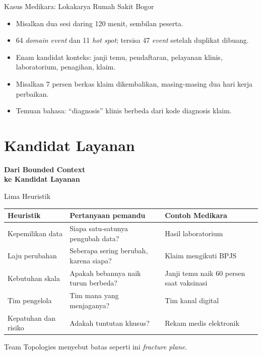 \documentclass[aspectratio=169, table, 12pt]{beamer}
\begin{document}
\begin{frame}{{\Large Kasus Medikara: Lokakarya Rumah Sakit Bogor}}
  \vspace{10pt}
  \begin{itemize}
    \item Misalkan dua sesi daring 120 menit, sembilan peserta.
    \item 64 \textit{domain event} dan 11 \textit{hot spot}; tersisa 47
          \textit{event} setelah duplikat dibuang.
    \item Enam kandidat konteks: janji temu, pendaftaran, pelayanan klinis,
          laboratorium, penagihan, klaim.
    \item Misalkan 7 persen berkas klaim dikembalikan, masing-masing dua hari kerja
          perbaikan.
    \item Temuan bahasa: ``diagnosis'' klinis berbeda dari kode diagnosis klaim.
  \end{itemize}
\end{frame}

\section{Kandidat Layanan}

\begin{frame}{\hfill}
  \centering
  \Huge{\textbf{Dari Bounded Context\\ke Kandidat Layanan}}
\end{frame}

\begin{frame}{{\Large Lima Heuristik}}
  \footnotesize
  \begin{tabularx}{\textwidth}{>{\raggedright\arraybackslash}p{3.0cm}
      >{\raggedright\arraybackslash}X >{\raggedright\arraybackslash}X}
    \hline
    \textbf{Heuristik} & \textbf{Pertanyaan pemandu} & \textbf{Contoh Medikara} \\
    \hline
    Kepemilikan data & Siapa satu-satunya pengubah data? & Hasil laboratorium \\
    \hline
    Laju perubahan & Seberapa sering berubah, karena siapa? & Klaim mengikuti BPJS \\
    \hline
    Kebutuhan skala & Apakah bebannya naik turun berbeda? & Janji temu naik 60 persen
      saat vaksinasi \\
    \hline
    Tim pengelola & Tim mana yang menjaganya? & Tim kanal digital \\
    \hline
    Kepatuhan dan risiko & Adakah tuntutan khusus? & Rekam medis elektronik \\
    \hline
  \end{tabularx}

  \vspace{8pt}
  \small
  Team Topologies menyebut batas seperti ini \textit{fracture plane}.
\end{frame}
\end{document}
